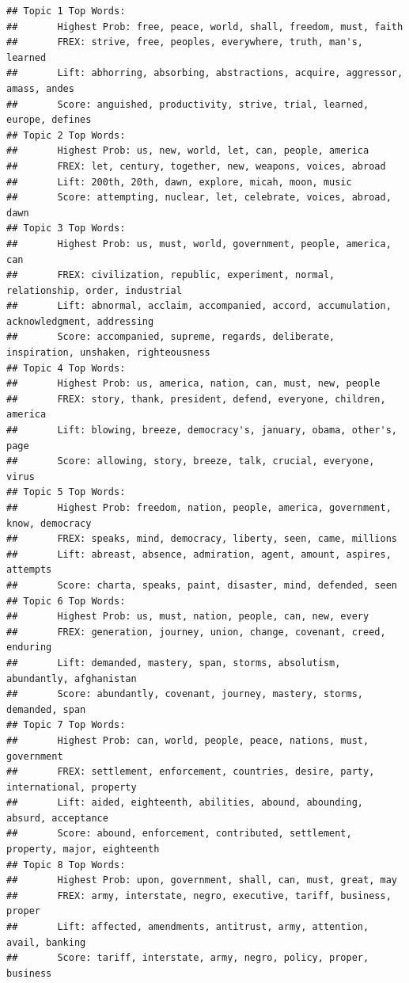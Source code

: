 \documentclass[
]{book}
\begin{document}
\begin{verbatim}
## Topic 1 Top Words:
##       Highest Prob: free, peace, world, shall, freedom, must, faith 
##       FREX: strive, free, peoples, everywhere, truth, man's, learned 
##       Lift: abhorring, absorbing, abstractions, acquire, aggressor, amass, andes 
##       Score: anguished, productivity, strive, trial, learned, europe, defines 
## Topic 2 Top Words:
##       Highest Prob: us, new, world, let, can, people, america 
##       FREX: let, century, together, new, weapons, voices, abroad 
##       Lift: 200th, 20th, dawn, explore, micah, moon, music 
##       Score: attempting, nuclear, let, celebrate, voices, abroad, dawn 
## Topic 3 Top Words:
##       Highest Prob: us, must, world, government, people, america, can 
##       FREX: civilization, republic, experiment, normal, relationship, order, industrial 
##       Lift: abnormal, acclaim, accompanied, accord, accumulation, acknowledgment, addressing 
##       Score: accompanied, supreme, regards, deliberate, inspiration, unshaken, righteousness 
## Topic 4 Top Words:
##       Highest Prob: us, america, nation, can, must, new, people 
##       FREX: story, thank, president, defend, everyone, children, america 
##       Lift: blowing, breeze, democracy's, january, obama, other's, page 
##       Score: allowing, story, breeze, talk, crucial, everyone, virus 
## Topic 5 Top Words:
##       Highest Prob: freedom, nation, people, america, government, know, democracy 
##       FREX: speaks, mind, democracy, liberty, seen, came, millions 
##       Lift: abreast, absence, admiration, agent, amount, aspires, attempts 
##       Score: charta, speaks, paint, disaster, mind, defended, seen 
## Topic 6 Top Words:
##       Highest Prob: us, must, nation, people, can, new, every 
##       FREX: generation, journey, union, change, covenant, creed, enduring 
##       Lift: demanded, mastery, span, storms, absolutism, abundantly, afghanistan 
##       Score: abundantly, covenant, journey, mastery, storms, demanded, span 
## Topic 7 Top Words:
##       Highest Prob: can, world, people, peace, nations, must, government 
##       FREX: settlement, enforcement, countries, desire, party, international, property 
##       Lift: aided, eighteenth, abilities, abound, abounding, absurd, acceptance 
##       Score: abound, enforcement, contributed, settlement, property, major, eighteenth 
## Topic 8 Top Words:
##       Highest Prob: upon, government, shall, can, must, great, may 
##       FREX: army, interstate, negro, executive, tariff, business, proper 
##       Lift: affected, amendments, antitrust, army, attention, avail, banking 
##       Score: tariff, interstate, army, negro, policy, proper, business
\end{verbatim}
\end{document}
